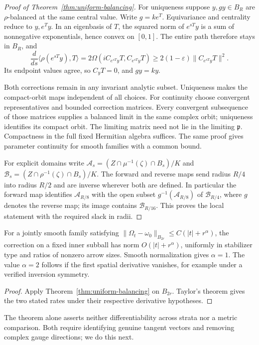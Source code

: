 \begin{proof}[Proof of Theorem~\ref{thm:uniform-balancing}]
For uniqueness suppose $y,gy\in B_R$ are $\rho$-balanced at the same
central value. Write $g=ke^T$. Equivariance and centrality reduce to
$y,e^Ty$. In an eigenbasis of $T$, the squared norm of $e^{sT}y$
is a sum of nonnegative exponentials, hence convex on $[0,1]$.
The entire path therefore stays in $B_R$, and
\[
 \frac{d}{ds}\langle\rho(e^{sT}y),T\rangle
 =2\Omega(iC_{e^{sT}y}T,C_{e^{sT}y}T)
 \ge2(1-\varepsilon)\|C_{e^{sT}y}T\|^2.
\]
Its endpoint values agree, so $C_yT=0$, and $gy=ky$.

Both corrections remain in any invariant analytic subset.
Uniqueness makes the compact-orbit maps independent of all choices.
For continuity choose convergent representatives and bounded correction
matrices. Every convergent subsequence of those matrices supplies a
balanced limit in the same complex orbit; uniqueness identifies its
compact orbit. The limiting matrix need not lie in the limiting
$\mathfrak p$. Compactness in the full fixed Hermitian algebra suffices.
The same proof gives parameter continuity for smooth families with a
common bound.

For explicit domains write
$\mathcal A_s=(Z\cap\mu^{-1}(\zeta)\cap B_s)/K$ and
$\mathcal B_s=(Z\cap\rho^{-1}(\zeta)\cap B_s)/K$.
The forward and reverse maps send radius $R/4$ into radius $R/2$
and are inverse wherever both are defined. In particular the forward
map identifies $\mathcal A_{R/8}$ with the open subset
$g^{-1}(\mathcal A_{R/8})$ of $\mathcal B_{R/4}$, where $g$ denotes
the reverse map; its image contains $\mathcal B_{R/16}$.
This proves the local statement with the required slack in radii.
\end{proof}

\begin{corollary}\label{cor:balancing-rate}
For a jointly smooth family satisfying
$\|\Omega_t-\omega_0\|_{B_{2r}}\le C(|t|+r^\alpha)$,
the correction on a fixed inner subball has norm
$O(|t|+r^\alpha)$, uniformly in stabilizer type and ratios of
nonzero arrow sizes. Smooth normalization gives $\alpha=1$.
The value $\alpha=2$ follows if the first spatial derivative vanishes,
for example under a verified inversion symmetry.
\end{corollary}
\begin{proof}
Apply Theorem~\ref{thm:uniform-balancing} on $B_{2r}$.
Taylor's theorem gives the two stated rates under their respective
derivative hypotheses.
\end{proof}
The theorem alone asserts neither differentiability across strata nor
a metric comparison. Both require identifying genuine tangent vectors
and removing complex gauge directions; we do this next.

